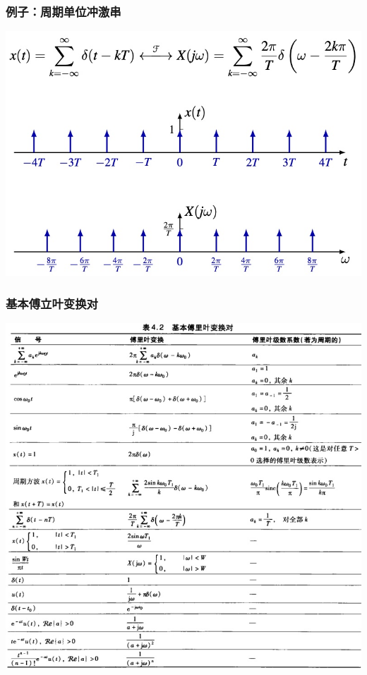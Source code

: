 \documentclass[CJKutf8,xcolor=pdftex,dvipsnames,table]{beamer}
\begin{document}
\begin{CJK*}{UTF8}{song}
  \begin{frame}
    \frametitle{例子：周期单位冲激串}
    \begin{center}
      \includegraphics[scale=.35]{ftpimpulse}
    \end{center}    
  \end{frame}    
    
  \begin{frame}
    \frametitle{基本傅立叶变换对}
    \begin{center}
      \includegraphics[scale=.29]{ss-c-t4-2}
    \end{center}
  \end{frame} 
    

\end{CJK*}
\end{document}
